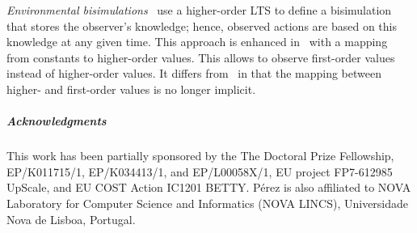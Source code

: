 \documentclass[a4paper,UKenglish]{lipics}
\theoremstyle{definition}
\begin{document}
\emph{Environmental bisimulations}~\cite{DBLP:conf/lics/SangiorgiKS07} 
use a higher-order LTS 
to define a bisimulation that stores the observer's knowledge; hence, observed actions are based on this knowledge
at any given time. This approach is enhanced in~\cite{DBLP:journals/cl/KoutavasH12}
with a mapping from constants to higher-order values. This 
allows to observe first-order values instead
of higher-order values. It differs from~\cite{San96H,JeffreyR05} in that 
the mapping between higher- and first-order values is no longer implicit.

\subparagraph{Acknowledgments} This work has been partially sponsored by the
The Doctoral Prize Fellowship, EP/K011715/1, EP/K034413/1,
 and EP/L00058X/1, 
EU project FP7-612985 UpScale,
and EU
COST Action IC1201 BETTY.  
P\'{e}rez is  also affiliated to NOVA  Laboratory for Computer Science and Informatics (NOVA LINCS),  Universidade Nova de Lisboa, Portugal.



%

{}
\end{document}
